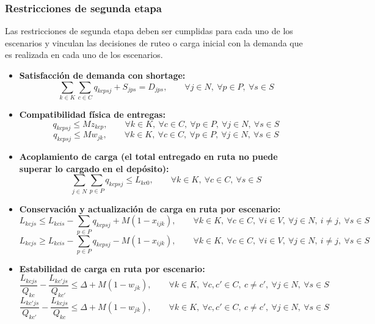 \subsubsection{Restricciones de segunda etapa}
Las restricciones de segunda etapa deben ser cumplidas para cada uno de los escenarios y vinculan las decisiones de ruteo o carga inicial con la demanda que es realizada en cada uno de los escenarios.

\begin{itemize}
    \item \textbf{Satisfacción de demanda con shortage:}
    \[
    \sum_{k \in K}\sum_{c \in C} q_{kcpsj} + S_{jps} = D_{jps},
    \qquad \forall j \in N,\ \forall p \in P,\ \forall s \in S
    \]

    \item \textbf{Compatibilidad física de entregas:}
    \[
    q_{kcpsj} \leq Mz_{kcp},
    \qquad \forall k \in K,\ \forall c \in C,\ \forall p \in P,\ \forall j \in N,\ \forall s \in S
    \]
    \[
    q_{kcpsj} \leq Mw_{jk},
    \qquad \forall k \in K,\ \forall c \in C,\ \forall p \in P,\ \forall j \in N,\ \forall s \in S
    \]

    \item \textbf{Acoplamiento de carga (el total entregado en ruta no puede superar lo cargado en el depósito):}
    \[
    \sum_{j \in N}\sum_{p \in P} q_{kcpsj} \leq L_{kc0},
    \qquad \forall k \in K,\ \forall c \in C,\ \forall s \in S
    \]

    \item \textbf{Conservación y actualización de carga en ruta por escenario:}
    \[
    L_{kcjs} \leq L_{kcis} - \sum_{p \in P} q_{kcpsj} + M(1-x_{ijk}),
    \qquad \forall k \in K,\ \forall c \in C,\ \forall i \in V,\ \forall j \in N,\ i \neq j,\ \forall s \in S
    \]
    \[
    L_{kcjs} \geq L_{kcis} - \sum_{p \in P} q_{kcpsj} - M(1-x_{ijk}),
    \qquad \forall k \in K,\ \forall c \in C,\ \forall i \in V,\ \forall j \in N,\ i \neq j,\ \forall s \in S
    \]

    \item \textbf{Estabilidad de carga en ruta por escenario:}
    \[
    \frac{L_{kcjs}}{Q_{kc}} - \frac{L_{kc'js}}{Q_{kc'}} 
    \leq \Delta + M(1-w_{jk}),
    \qquad \forall k \in K,\ \forall c,c' \in C,\ c \neq c',\ \forall j \in N,\ \forall s \in S
    \]
    \[
    \frac{L_{kc'js}}{Q_{kc'}} - \frac{L_{kcjs}}{Q_{kc}} 
    \leq \Delta + M(1-w_{jk}),
    \qquad \forall k \in K,\ \forall c,c' \in C,\ c \neq c',\ \forall j \in N,\ \forall s \in S
    \]
\end{itemize}

